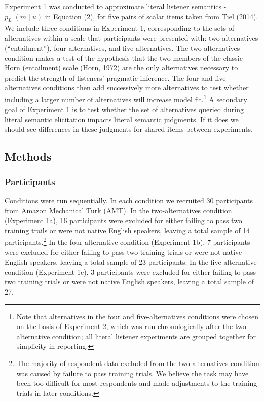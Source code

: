 \documentclass[10pt, letterpaper]{article}
\begin{document}
Experiment 1 was conducted to approximate literal listener semantics -
\(p_{L_0}(m \mid u)\) in Equation (2), for five pairs of scalar items
taken from Tiel (2014). We include three conditions in Experiment 1,
corresponding to the sets of alternatives within a scale that
participants were presented with: two-alternatives (``entailment''),
four-alternatives, and five-alternatives. The two-alternatives condition
makes a test of the hypothesis that the two members of the classic Horn
(entailment) scale (Horn, 1972) are the only alternatives necessary to
predict the strength of listeners' pragmatic inference. The four and
five-alternatives conditions then add successively more alternatives to
test whether including a larger number of alternatives will increase
model
fit.\footnote{Note that alternatives in the four and five-alternatives conditions were chosen on the basis of Experiment 2, which was run chronologically after the two-alternative condition; all literal listener experiments are grouped together for simplicity in reporting.}
A secondary goal of Experiment 1 is to test whether the set of
alternatives queried during literal semantic elicitation impacts literal
semantic judgments. If it does we should see differences in these
judgments for shared items between experiments.

\subsection{Methods}\label{methods}

\subsubsection{Participants}\label{participants}

Conditions were run sequentially. In each condition we recruited 30
participants from Amazon Mechanical Turk (AMT). In the two-alternatives
condition (Experiment 1a), 16 participants were excluded for either
failing to pass two training trails or were not native English speakers,
leaving a total sample of 14
participants.\footnote{The majority of respondent data excluded from the two-alternatives condition was caused by failure to pass training trials. We believe the task may have been too difficult for most respondents and made adjustments to the training trials in later conditions.}
In the four alternative condition (Experiment 1b), 7 participants were
excluded for either failing to pass two training trials or were not
native English speakers, leaving a total sample of 23 participants. In
the five alternative condition (Experiment 1c), 3 participants were
excluded for either failing to pass two training trials or were not
native English speakers, leaving a total sample of 27.
\end{document}
